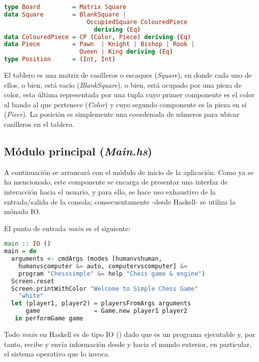 \documentclass{llncs}
\begin{document}
\begin{lstlisting}[frame=single, language=haskell, captionpos=b, caption=Tipo de Board y derivados, label={lst:tipo_board}]
type Board         = Matrix Square
data Square        = BlankSquare |
                       OccupiedSquare ColouredPiece
                         deriving (Eq)
data ColouredPiece = CP (Color, Piece) deriving (Eq)
data Piece         = Pawn  | Knight | Bishop | Rook |
                     Queen | King deriving (Eq)
type Position      = (Int, Int)
\end{lstlisting}

El tablero es una matriz de casilleros o escaques (\textit{Square}), en donde cada uno de ellos, o bien, está vacío (\textit{BlankSquare}), o bien, está ocupado por una pieza de color, esta última representada por una tupla cuyo primer componente es el color al bando al que pertenece (\textit{Color}) y cuyo segundo componente es la pieza en sí (\textit{Piece}). La posición es simplemente una coordenada de números para ubicar casilleros en el tablero.

\subsection{Módulo principal (\textit{Main.hs})}

A continuación se arrancará con el módulo de inicio de la aplicación. Como ya se ha mencionado, este componente se encarga de presentar una interfaz de interacción hacia el usuario, y para ello, se hace uso exhaustivo de la entrada/salida de la consola; consecuentamente -desde Haskell- se utiliza la mónada IO.

El punto de entrada \textit{main} es el siguiente:

\begin{lstlisting}[frame=single, language=haskell, captionpos=b, caption=Punto de entrada de la aplicación, label={lst:punto_entrada}]
main :: IO ()
main = do
  arguments <- cmdArgs (modes [humanvshuman,
    humanvscomputer &= auto, computervscomputer] &=
    program "Chesssimple" &= help "Chess game & engine")
  Screen.reset
  Screen.printWithColor "Welcome to Simple Chess Game"
    "white"
  let (player1, player2) = playersFromArgs arguments
      game               = Game.new player1 player2
   in performGame game
\end{lstlisting}

Todo \textit{main} en Haskell es de tipo IO () dado que es un programa ejecutable y, por tanto, recibe y envía información desde y hacia el mundo exterior, en particular, el sistema operativo que lo invoca.
\end{document}
